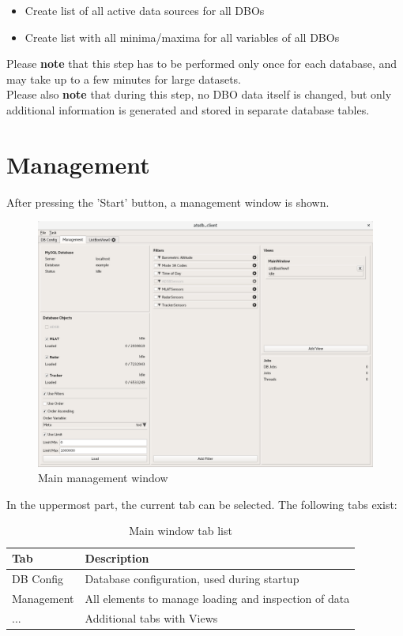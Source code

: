 \documentclass[10pt,letterpaper,extrafontsizes]{memoir}
\begin{document}
\begin{itemize}  
\item Create list of all active data sources for all DBOs
\item Create list with all minima/maxima for all variables of all DBOs
\end{itemize}

Please \textbf{note} that this step has to be performed only once for each database, and may take up to a few minutes for large datasets. \\

Please also \textbf{note} that during this step, no DBO data itself is changed, but only additional information is generated and stored in separate database tables.

\section{Management}
\label{sec:management}

After pressing the 'Start' button, a management window is shown.

\begin{figure}[H]
  \hspace*{-2cm}
    \includegraphics[width=18cm]{../screenshots/management.png}
  \caption{Main management window}
  \label{fig:db_postprocessing}
\end{figure}

In the uppermost part, the current tab can be selected. The following tabs exist:

\begin{table}[h]
  \center
  \begin{tabular}{ | l | l |}
    \hline
    \textbf{Tab} & \textbf{Description} \\ \hline
    DB Config & Database configuration, used during startup \\ \hline
    Management & All elements to manage loading and inspection of data \\ \hline
    ... & Additional tabs with Views \\
    \hline
  \end{tabular}
  \caption{Main window tab list}
\end{table}
\end{document}
